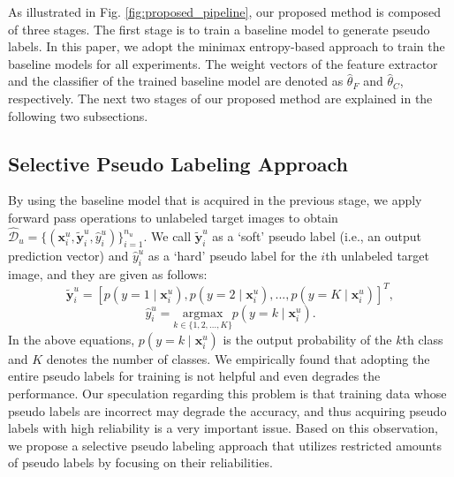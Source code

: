 \documentclass[a4paper,conference]{IEEEtran}
\begin{document}
As illustrated in Fig. \ref{fig:proposed_pipeline}, our proposed method is composed of three stages. The first stage is to train a baseline model to generate pseudo labels. In this paper, we adopt the minimax entropy-based approach \cite{saito2019mme} to train the baseline models for all experiments. The weight vectors of the feature extractor and the classifier of the trained baseline model are denoted as $\hat{\theta}_{F}$ and $\hat{\theta}_{C}$, respectively. The next two stages of our proposed method are explained in the following two subsections.







\subsection{Selective Pseudo Labeling Approach}
\label{sec:2A}
By using the baseline model that is acquired in the previous stage, we apply forward pass operations to unlabeled target images to obtain $\hat{\mathcal{D}}_{u}=\{(\mathbf{x}_{i}^{u}, \widetilde{\mathbf{y}}_{i}^{u}, \hat{y}_{i}^{u})\}_{i=1}^{n_{u}}$. We call $\widetilde{\mathbf{y}}_{i}^{u}$ as a `soft' pseudo label (i.e., an output prediction vector) and $\hat{y}_{i}^{u}$ as a `hard' pseudo label for the $i$th unlabeled target image, and they are given as follows:
\begin{equation}
\widetilde{\mathbf{y}}_{i}^{u}=[p(y=1\mid\mathbf{x}_{i}^{u}),p(y=2\mid\mathbf{x}_{i}^{u}),...,p(y=K\mid\mathbf{x}_{i}^{u})]^{T},
\label{soft_label}
\end{equation}
\begin{equation}
\hat{y}_{i}^{u}=\underset{k\in\{ 1, 2, ..., K\}}{\text{argmax}}p(y=k\mid\mathbf{x}_{i}^{u}).
\label{hard_label}
\end{equation}
In the above equations, $p(y=k\mid\mathbf{x}_{i}^{u})$ is the output probability of the $k$th class and $K$ denotes the number of classes. We empirically found that adopting the entire pseudo labels for training is not helpful and even degrades the performance. Our speculation regarding this problem is that training data whose pseudo labels are incorrect may degrade the accuracy, and thus acquiring pseudo labels with high reliability is a very important issue. Based on this observation, we propose a selective pseudo labeling approach that utilizes restricted amounts of pseudo labels by focusing on their reliabilities.
\end{document}
